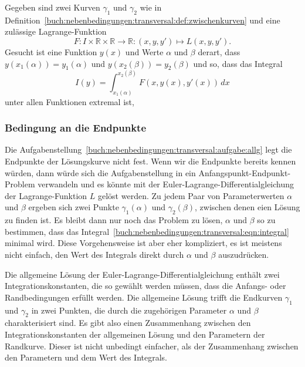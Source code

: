 \begin{aufgabe}
\label{buch:nebenbedingungen:transversal:aufgabe:allg}
Gegeben sind zwei Kurven $\gamma_1$ und $\gamma_2$ wie in
Definition~\ref{buch:nebenbedingungen:transversal:def:zwischenkurven}
und eine zulässige Lagrange-Funktion 
\[
F\colon I\times \mathbb{R}\times\mathbb{R}\to\mathbb{R}
: (x,y,y') \mapsto L(x,y,y').
\]
Gesucht ist eine Funktion $y(x)$ und Werte $\alpha$ und $\beta$ derart,
dass $y(x_1(\alpha)) = y_1(\alpha)$ und $y(x_2(\beta))=y_2(\beta)$
und so, dass das Integral
\begin{equation}
I(y)
=
\int_{x_1(\alpha)}^{x_2(\beta)} 
F(x,y(x),y'(x))
\,dx
\label{buch:nebenbedingungen:transversal:eqn:integral}
\end{equation}
unter allen Funktionen extremal ist, 
\end{aufgabe}

%
%
\subsubsection{Bedingung an die Endpunkte}
Die Aufgabenstellung~\ref{buch:nebenbedingungen:transversal:aufgabe:allg}
legt die Endpunkte der Lösungskurve nicht fest.
Wenn wir die Endpunkte bereits kennen würden, dann würde sich die
Aufgabenstellung in ein Anfangs\-punkt-End\-punkt-Problem verwandeln und
es könnte mit der Euler-Lagrange-Differential\-gleichung der Lagrange-Funktion
$L$ gelöst werden.
Zu jedem Paar von Parameterwerten $\alpha$ und $\beta$ ergeben sich
zwei Punkte $\gamma_1(\alpha)$ und $\gamma_2(\beta)$, zwischen denen
eien Lösung zu finden ist.
Es bleibt dann nur noch das Problem zu lösen, $\alpha$ und $\beta$ so
zu bestimmen, dass das
Integral~\eqref{buch:nebenbedingungen:transversal:eqn:integral}
minimal wird.
Diese Vorgehensweise ist aber eher kompliziert, es ist meistens nicht
einfach, den Wert des Integrals direkt durch $\alpha$ und $\beta$
auszudrücken.

Die allgemeine Lösung der Euler-Lagrange-Differentialgleichung enthält
zwei Integrationskonstanten, die so gewählt werden müssen, dass die
Anfangs- oder Randbedingungen erfüllt werden.
Die allgemeine Lösung trifft die Endkurven $\gamma_1$ und $\gamma_2$
in zwei Punkten, die durch die zugehörigen Parameter $\alpha$ und $\beta$
charakterisiert sind.
Es gibt also einen Zusammenhang zwischen den Integrationskonstanten der
allgemeinen Lösung und den Parametern der Randkurve.
Dieser ist nicht unbedingt einfacher, als der Zusammenhang zwischen den
Parametern und dem Wert des Integrals.

